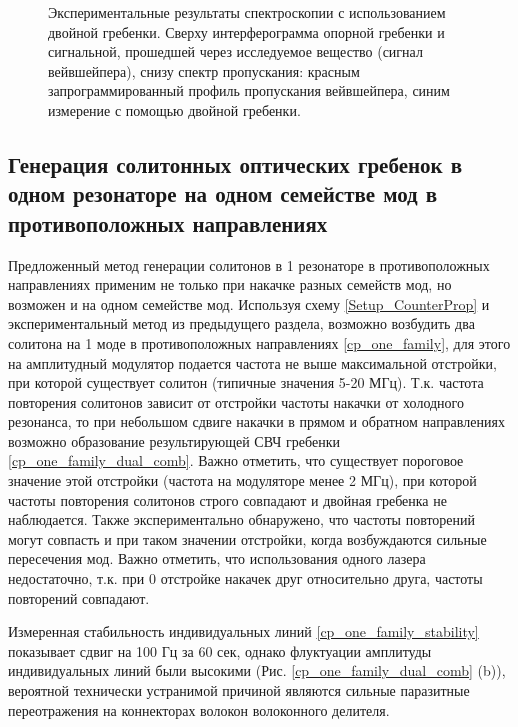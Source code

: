 \begin{figure}[ht]
\begin{minipage}[ht]{1\linewidth}
\end{minipage}
\caption{Экспериментальные результаты спектроскопии с использованием двойной гребенки. Сверху интерферограмма опорной гребенки и сигнальной, прошедшей через исследуемое вещество (сигнал вейвшейпера), снизу спектр пропускания: красным запрограммированный профиль пропускания вейвшейпера, синим измерение с помощью двойной гребенки.}
\label{fig3_spectroscopy}
\end{figure}


\subsection{Генерация солитонных оптических гребенок в одном резонаторе на одном семействе мод в противоположных направлениях}

Предложенный метод генерации солитонов в 1 резонаторе в противоположных направлениях применим не только при накачке разных семейств мод, но возможен и на одном семействе мод. Используя схему \ref{Setup_CounterProp} и экспериментальный метод из предыдущего раздела, возможно возбудить два солитона на 1 моде в противоположных направлениях \ref{cp_one_family}, для этого на амплитудный модулятор подается частота не выше максимальной отстройки, при которой существует солитон (типичные значения 5-20 МГц). Т.к. частота повторения солитонов зависит от отстройки частоты накачки от холодного резонанса, то при небольшом сдвиге накачки в прямом и обратном направлениях возможно образование результирующей СВЧ гребенки \ref{cp_one_family_dual_comb}. Важно отметить, что существует пороговое значение этой отстройки (частота на модуляторе менее 2 МГц), при которой частоты повторения солитонов строго совпадают и двойная гребенка не наблюдается. Также экспериментально обнаружено, что частоты повторений могут совпасть и при таком значении отстройки, когда возбуждаются сильные пересечения мод. Важно отметить, что использования одного лазера недостаточно, т.к. при 0 отстройке накачек друг относительно друга, частоты повторений совпадают.

Измеренная стабильность индивидуальных линий \ref{cp_one_family_stability} показывает сдвиг на 100 Гц за 60 сек, однако флуктуации амплитуды индивидуальных линий были высокими (Рис. \ref{cp_one_family_dual_comb} (b)), вероятной технически устранимой причиной являются сильные паразитные переотражения на коннекторах волокон волоконного делителя.

